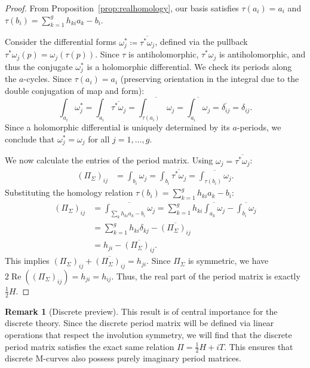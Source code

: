 \documentclass[11pt,a4paper]{article}
\theoremstyle{definition}
\newtheorem*{remark}{Remark}
\renewcommand{\Re}{\operatorname{Re}}
\begin{document}
\begin{proof}
	From Proposition~\ref{prop:realhomology}, our basis satisfies $\tau(a_i) = a_i$ and $\tau(b_i) = \sum_{k=1}^g h_{ki} a_k - b_i$.
	
Consider the differential forms $\omega^*_j \coloneq \overline{\tau^*\omega_j}$, defined via the pullback $\tau^*\omega_j(p) = \omega_j(\tau(p))$. Since $\tau$ is antiholomorphic, $\tau^*\omega_j$ is antiholomorphic, and thus the conjugate $\omega^*_j$ is a holomorphic differential. We check its periods along the $a$-cycles. Since $\tau(a_i) = a_i$ (preserving orientation in the integral due to the double conjugation of map and form):
\[
\int_{a_i} \omega^*_j = \int_{a_i} \overline{\tau^* \omega_j} = \overline{\int_{\tau(a_i)} \omega_j} = \overline{\int_{a_i} \omega_j} = \overline{\delta_{ij}} = \delta_{ij}.
\]
Since a holomorphic differential is uniquely determined by its $a$-periods, we conclude that $\omega^*_j = \omega_j$ for all $j=1,\ldots,g$.
	
	We now calculate the entries of the period matrix. Using $\omega_j = \overline{\tau^*\omega_j}$:
	\begin{align*}
		(\Pi_{\Sigma})_{ij} &= \int_{b_i} \omega_j = \int_{b_i} \overline{\tau^*\omega_j} = \overline{\int_{\tau(b_i)} \omega_j}.
	\end{align*}
	Substituting the homology relation $\tau(b_i) = \sum_{k=1}^g h_{ki} a_k - b_i$:
	\begin{align*}
		(\Pi_{\Sigma})_{ij} &= \overline{\int_{\sum_{k} h_{ki} a_k - b_i} \omega_j} 
		= \sum_{k=1}^g h_{ki} \overline{\int_{a_k} \omega_j} - \overline{\int_{b_i} \omega_j} \\
		&= \sum_{k=1}^g h_{ki} \delta_{kj} - \overline{(\Pi_{\Sigma})_{ij}} \\
		&= h_{ji} - \overline{(\Pi_{\Sigma})_{ij}}.
	\end{align*}
	This implies $(\Pi_{\Sigma})_{ij} + \overline{(\Pi_{\Sigma})_{ij}} = h_{ji}$. Since $\Pi_{\Sigma}$ is symmetric, we have $2 \Re((\Pi_{\Sigma})_{ij}) = h_{ji} = h_{ij}$. Thus, the real part of the period matrix is exactly $\frac{1}{2}H$.
\end{proof}

\begin{remark}[Discrete preview]
	This result is of central importance for the discrete theory. Since the discrete period matrix will be defined via linear operations that respect the involution symmetry, we will find that the discrete period matrix satisfies the exact same relation $\Pi = \frac{1}{2} H + i T$. This ensures that discrete M-curves also possess purely imaginary period matrices.
\end{remark}
\end{document}
